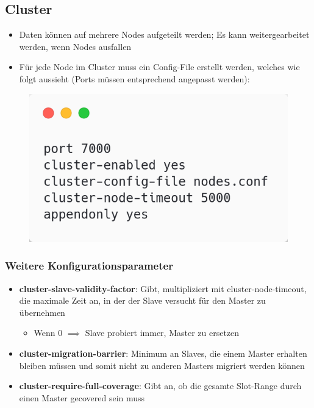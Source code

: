 \subsection{Cluster}
\begin{itemize}
    \item Daten können auf mehrere Nodes aufgeteilt werden; Es kann weitergearbeitet werden, wenn Nodes ausfallen
    \item Für jede Node im Cluster muss ein Config-File erstellt werden, welches wie folgt aussieht (Ports müssen entsprechend angepasst werden):
\end{itemize}
\begin{figure}[H]
    \centering
    \includegraphics[scale=.3]{res/themenkorb_8/redis_cluster_config.png}
\end{figure}

\subsubsection{Weitere Konfigurationsparameter}
\begin{itemize}
    \item \textbf{cluster-slave-validity-factor}: Gibt, multipliziert mit cluster-node-timeout, die maximale Zeit an, in der der Slave versucht für den Master zu übernehmen
    \begin{itemize}
        \item Wenn 0 $\implies$ Slave probiert immer, Master zu ersetzen
    \end{itemize}
    \item \textbf{cluster-migration-barrier}: Minimum an Slaves, die einem Master erhalten bleiben müssen und somit nicht zu anderen Masters migriert werden können
    \item \textbf{cluster-require-full-coverage}: Gibt an, ob die gesamte Slot-Range durch einen Master gecovered sein muss
\end{itemize}

